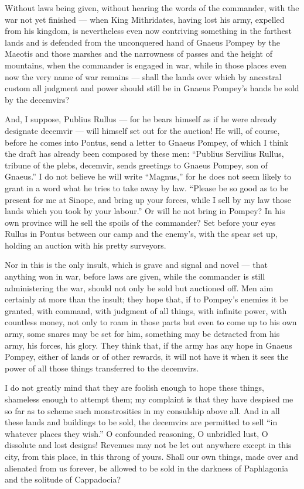 Without laws being given, without hearing the words of the commander, with the war not yet finished --- when King Mithridates, having lost his army, expelled from his kingdom, is nevertheless even now contriving something in the farthest lands and is defended from the unconquered hand of Gnaeus Pompey by the Maeotis and those marshes and the narrowness of passes and the height of mountains, when the commander is engaged in war, while in those places even now the very name of war remains --- shall the lands over which by ancestral custom all judgment and power should still be in Gnaeus Pompey's hands be sold by the decemvirs?

 And, I suppose, Publius Rullus --- for he bears himself as if he were already designate decemvir --- will himself set out for the auction! He will, of course, before he comes into Pontus, send a letter to Gnaeus Pompey, of which I think the draft has already been composed by these men: ``Publius Servilius Rullus, tribune of the plebs, decemvir, sends greetings to Gnaeus Pompey, son of Gnaeus.'' I do not believe he will write ``Magnus,'' for he does not seem likely to grant in a word what he tries to take away by law. ``Please be so good as to be present for me at Sinope, and bring up your forces, while I sell by my law those lands which you took by your labour.'' Or will he not bring in Pompey? In his own province will he sell the spoils of the commander? Set before your eyes Rullus in Pontus between our camp and the enemy's, with the spear set up, holding an auction with his pretty surveyors.

 Nor in this is the only insult, which is grave and signal and novel --- that anything won in war, before laws are given, while the commander is still administering the war, should not only be sold but auctioned off. Men aim certainly at more than the insult; they hope that, if to Pompey's enemies it be granted, with command, with judgment of all things, with infinite power, with countless money, not only to roam in those parts but even to come up to his own army, some snares may be set for him, something may be detracted from his army, his forces, his glory. They think that, if the army has any hope in Gnaeus Pompey, either of lands or of other rewards, it will not have it when it sees the power of all those things transferred to the decemvirs.

 I do not greatly mind that they are foolish enough to hope these things, shameless enough to attempt them; my complaint is that they have despised me so far as to scheme such monstrosities in my consulship above all. And in all these lands and buildings to be sold, the decemvirs are permitted to sell ``in whatever places they wish.'' O confounded reasoning, O unbridled lust, O dissolute and lost designs! Revenues may not be let out anywhere except in this city, from this place, in this throng of yours. Shall our own things, made over and alienated from us forever, be allowed to be sold in the darkness of Paphlagonia and the solitude of Cappadocia?

